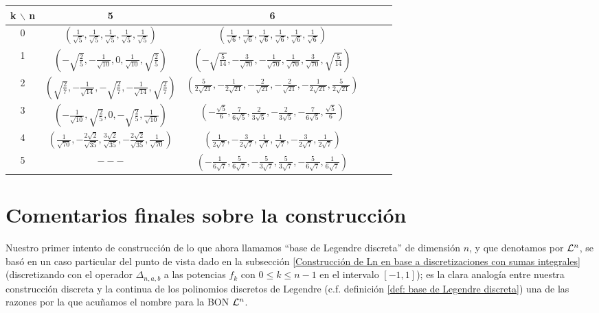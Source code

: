 \begin{center}
\begin{tabular}{ c c c c c c }
k $\backslash$ n & 5 & 6  \\ 
\hline
0 & 
$\left(\frac{1}{\sqrt{5}}, \frac{1}{\sqrt{5}}, \frac{1}{\sqrt{5}},
\frac{1}{\sqrt{5}}, \frac{1}{\sqrt{5}} \right)$ 
& $\left(\frac{1}{\sqrt{6}}, \frac{1}{\sqrt{6}}, \frac{1}{\sqrt{6}},
\frac{1}{\sqrt{6}}, \frac{1}{\sqrt{6}}, \frac{1}{\sqrt{6}} \right)$ \\ 
1 &  
$\left(-\sqrt{\frac{2}{5}}, -\frac{1}{\sqrt{10}}, 0,
\frac{1}{\sqrt{10}}, \sqrt{\frac{2}{5}} \right)$  & 
$\left(-\sqrt{\frac{5}{14}}, -\frac{3}{\sqrt{70}}, -\frac{1}{\sqrt{70}},
\frac{1}{\sqrt{70}}, \frac{3}{\sqrt{70}}, \sqrt{\frac{5}{14}} \right)$ \\ 
2 & 
$\left(\sqrt{\frac{2}{7}}, -\frac{1}{\sqrt{14}}, -\sqrt{\frac{2}{7}},
-\frac{1}{\sqrt{14}}, \sqrt{\frac{2}{7}} \right)$ 
& $\left(\frac{5}{2\sqrt{21}}, -\frac{1}{2\sqrt{21}}, -\frac{2}{\sqrt{21}},
-\frac{2}{\sqrt{21}}, -\frac{1}{2\sqrt{21}}, \frac{5}{2\sqrt{21}} \right)$ \\ 
3 & 
$\left(-\frac{1}{\sqrt{10}}, \sqrt{\frac{2}{5}}, 0,
-\sqrt{\frac{2}{5}}, \frac{1}{\sqrt{10}} \right)$ &
$\left(-\frac{\sqrt{5}}{6}, \frac{7}{6\sqrt{5}}, \frac{2}{3\sqrt{5}},
-\frac{2}{3\sqrt{5}}, -\frac{7}{6\sqrt{5}}, \frac{\sqrt{5}}{6} \right)$ \\ 
4 & $\left(\frac{1}{\sqrt{70}}, -\frac{2\sqrt{2}}{\sqrt{35}}, 
\frac{3\sqrt{2}}{\sqrt{35}},
-\frac{2\sqrt{2}}{\sqrt{35}}, \frac{1}{\sqrt{70}} \right) $ & 
$\left(\frac{1}{2\sqrt{7}}, -\frac{3}{2\sqrt{7}}, \frac{1}{\sqrt{7}},
\frac{1}{\sqrt{7}}, -\frac{3}{2\sqrt{7}}, \frac{1}{2\sqrt{7}} \right)$ \\ 
5 & $---$ & 
$\left(-\frac{1}{6\sqrt{7}}, \frac{5}{6\sqrt{7}}, -\frac{5}{3\sqrt{7}},
\frac{5}{3\sqrt{7}}, -\frac{5}{6\sqrt{7}}, \frac{1}{6\sqrt{7}} \right)$ 
\end{tabular}
\end{center}





\section{Comentarios finales sobre la construcción} 
\label{sec: commentarios finales}
Nuestro primer intento de 
construcción de lo que ahora llamamos 
``base de Legendre discreta'' de dimensión $n$,
y que denotamos por
$\mathcal{L}^{n}$, se basó en 
un caso particular del punto de vista
dado en la subsección 
\ref{Construcción de Ln en base a discretizaciones con sumas integrales}
(discretizando con el operador $\Delta_{n,a,b}$
a las potencias $f_{k}$
con $0 \leq k \leq n-1$
en el intervalo $[-1,1]$); es la clara analogía 
entre nuestra construcción discreta y la continua
de los polinomios discretos de Legendre (c.f.
definición \ref{def: base de Legendre discreta}) una de las
razones por la que acuñamos el nombre para
la BON $\mathcal{L}^{n}$. \\ 

